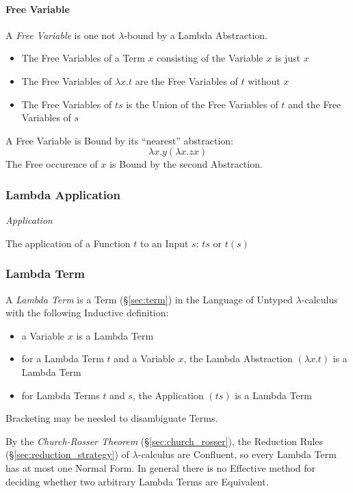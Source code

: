 \paragraph{Free Variable}\label{sec:free_variable}\hfill

A \emph{Free Variable} is one not $\lambda$-bound by a Lambda
Abstraction.

\begin{itemize}
  \item The Free Variables of a Term $x$ consisting of the Variable
    $x$ is just $x$
  \item The Free Variables of $\lambda x.t$ are the Free Variables of
    $t$ without $x$
  \item The Free Variables of $ts$ is the Union of the Free Variables
    of $t$ and the Free Variables of $s$
\end{itemize}

A Free Variable is Bound by its ``nearest'' abstraction:
\[
  \lambda x.y (\lambda x.z x)
\]
The Free occurence of $x$ is Bound by the second Abstraction.



\subsubsection{Lambda Application}\label{sec:lambda_application}

\emph{Application}

The application of a Function $t$ to an Input $s$: $ts$ or $t(s)$



\subsubsection{Lambda Term}\label{sec:lambda_term}

A \emph{Lambda Term} is a Term (\S\ref{sec:term}) in the Language of
Untyped $\lambda$-calculus with the following Inductive definition:
\begin{itemize}
  \item a Variable $x$ is a Lambda Term
  \item for a Lambda Term $t$ and a Variable $x$, the Lambda
    Abstraction $(\lambda x.t)$ is a Lambda Term
  \item for Lambda Terms $t$ and $s$, the Application $(ts)$ is a
    Lambda Term
\end{itemize}
Bracketing may be needed to disambiguate Terms.

By the \emph{Church-Rosser Theorem} (\S\ref{sec:church_rosser}), the
Reduction Rules (\S\ref{sec:reduction_strategy}) of $\lambda$-calculus
are Confluent, so every Lambda Term has at most one Normal Form. In
general there is no Effective method for deciding whether two
arbitrary Lambda Terms are Equivalent.




